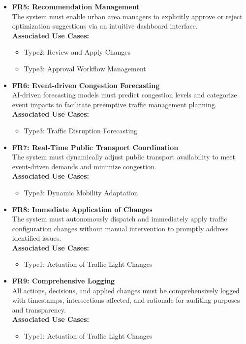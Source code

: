 \documentclass[a4paper,12pt]{article}
\begin{document}
\begin{itemize}
\item \textbf{FR5: Recommendation Management} \\
The system must enable urban area managers to explicitly approve or reject optimization suggestions via an intuitive dashboard interface. \\
\textbf{Associated Use Cases:}
\begin{itemize}
\item Type2: Review and Apply Changes
\item Type3: Approval Workflow Management
\end{itemize}

\item \textbf{FR6: Event-driven Congestion Forecasting} \\
AI-driven forecasting models must predict congestion levels and categorize event impacts to facilitate preemptive traffic management planning. \\
\textbf{Associated Use Cases:}
\begin{itemize}
\item Type3: Traffic Disruption Forecasting
\end{itemize}

\item \textbf{FR7: Real-Time Public Transport Coordination} \\
The system must dynamically adjust public transport availability to meet event-driven demands and minimize congestion. \\
\textbf{Associated Use Cases:}
\begin{itemize}
\item Type3: Dynamic Mobility Adaptation
\end{itemize}

\item \textbf{FR8: Immediate Application of Changes} \\
The system must autonomously dispatch and immediately apply traffic configuration changes without manual intervention to promptly address identified issues. \\
\textbf{Associated Use Cases:}
\begin{itemize}
\item Type1: Actuation of Traffic Light Changes
\end{itemize}

\item \textbf{FR9: Comprehensive Logging} \\
All actions, decisions, and applied changes must be comprehensively logged with timestamps, intersections affected, and rationale for auditing purposes and transparency. \\
\textbf{Associated Use Cases:}
\begin{itemize}
\item Type1: Actuation of Traffic Light Changes
\end{itemize}


\end{itemize}
\end{document}
